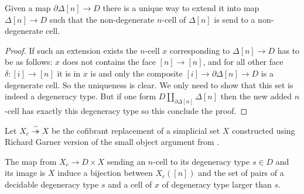 \documentclass[reqno,10pt,a4paper,oneside,draft]{amsart}
\begin{document}
\begin{lemma}

Given a map $\partial \Delta[n] \rightarrow D$ there is a unique way to extend it into map $\Delta[n] \rightarrow D$ such that the non-degenerate $n$-cell of $\Delta[n]$ is send to a non-degenerate cell.
\end{lemma}

\begin{proof}
If such an extension exists the $n$-cell $x$ corresponding to $\Delta[n] \rightarrow D$ has to be as follows: $x$ does not contains the face $[n] \rightarrow [n]$, and for all other face $\delta:[i] \rightarrow [n]$ it is in $x$ is and only the composite $[i] \rightarrow \partial \Delta[n] \rightarrow D$ is a degenerate cell. So the uniqueness is clear. We only need to show that this set is indeed a degeneracy type. But if one form $D \coprod_{\partial \Delta[n]} \Delta[n]$ then the new added $n$-cell has exactly this degeneracy type so this conclude the proof.
\end{proof}

Let $X_c \overset{\sim}{\twoheadrightarrow} X $ be the cofibrant replacement of a simplicial set $X$ constructed using Richard Garner version of the small object argument from \cite{garner:small-object-argument}.

\begin{proposition}
The map from $X_c \rightarrow D \times X$ sending an $n$-cell to its degeneracy type $s \in D$ and its image is $X$ induce a bijection between $X_c([n])$ and the set of pairs of a decidable degeneracy type $s$ and a cell of $x$ of degeneracy type larger than $s$.
\end{proposition}
\end{document}
